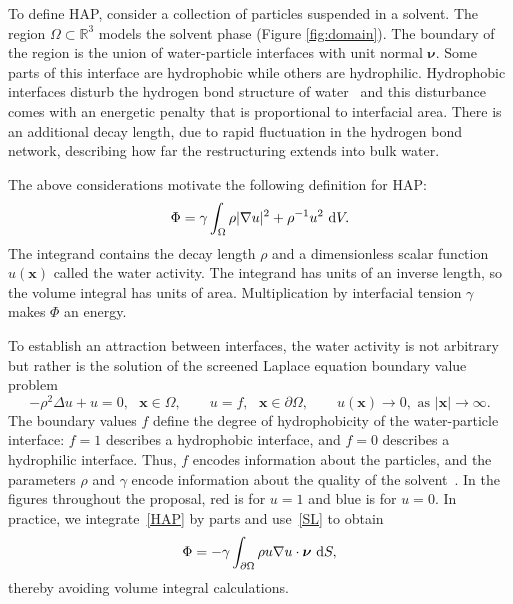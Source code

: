 To define HAP, consider a collection of particles suspended in a
solvent. The region $\Omega \subset \mathbb{R}^3$ models the solvent
phase (Figure \ref{fig:domain}).
The boundary of the region is the union of water-particle interfaces
with unit normal $\boldsymbol{\nu}$. Some parts of this interface are
hydrophobic while others are hydrophilic. Hydrophobic interfaces disturb
the hydrogen bond structure of water~\cite{Luzar1987, Jonsson2006,
Varilly2011} and this disturbance comes with an energetic penalty that
is proportional to interfacial area. There is an additional decay
length, due to rapid fluctuation in the hydrogen bond network,
describing how far the restructuring extends into bulk water.

The above considerations motivate the following definition for HAP:
\begin{align}
\label{HAP}
  \Phi = \gamma \int_{\Omega} \rho |\nabla u|^2 + \rho^{-1}u^2 \,\dif V. 
\end{align}
The integrand contains
the decay length $\rho$
and a dimensionless scalar function $u(\mathbf{x})$ called the water activity.
The integrand has units of an inverse length, so
the volume integral has units of area. Multiplication by interfacial tension
$\gamma$ makes $\Phi$ an energy. 

To establish an attraction between interfaces, the water activity is not
arbitrary but rather is the solution of the screened Laplace
equation boundary value problem 
\begin{equation}
  \label{SL}
  -\rho^2 \Delta u + u = 0, \mbox{ } \mathbf{x} \in \Omega, \qquad
  u = f,  \mbox{ } \mathbf{x} \in \partial \Omega, \qquad 
  u(\mathbf{x}) \to 0, \mbox{ as } |\mathbf{x}| \to \infty.
\end{equation}
The boundary values $f$ define the degree of hydrophobicity of the
water-particle interface: $f=1$ describes a hydrophobic interface, and
$f=0$ describes a hydrophilic interface. Thus, $f$ encodes information
about the particles, and the parameters $\rho$ and $\gamma$ encode
information about the quality of the solvent~\cite{Israelachvili1954,
Discher2002}.
In the figures throughout the proposal, red is for $u = 1$ and blue is for $u = 0$.
In practice, we integrate~\eqref{HAP} by parts and
use~\eqref{SL} to obtain
\begin{equation}
\label{eq:HAP_easy}
\Phi = -\gamma \int_{\partial \Omega} \rho u \nabla u \cdot \boldsymbol{\nu} \,\dif S,
\end{equation}
thereby avoiding volume integral calculations.


